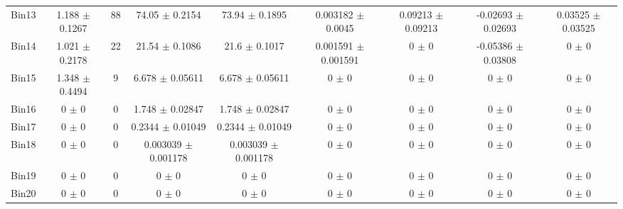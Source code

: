 \begin{tabular}{@{\extracolsep{4pt}}lcccccccc@{}}
     Bin13 & 1.188 $\pm$ 0.1267 & 88 & 74.05 $\pm$ 0.2154 & 73.94 $\pm$ 0.1895 & 0.003182 $\pm$ 0.0045 & 0.09213 $\pm$ 0.09213 & -0.02693 $\pm$ 0.02693 & 0.03525 $\pm$ 0.03525 \\ 
     Bin14 & 1.021 $\pm$ 0.2178 & 22 & 21.54 $\pm$ 0.1086 & 21.6 $\pm$ 0.1017 & 0.001591 $\pm$ 0.001591 & 0 $\pm$ 0 & -0.05386 $\pm$ 0.03808 & 0 $\pm$ 0 \\ 
     Bin15 & 1.348 $\pm$ 0.4494 & 9 & 6.678 $\pm$ 0.05611 & 6.678 $\pm$ 0.05611 & 0 $\pm$ 0 & 0 $\pm$ 0 & 0 $\pm$ 0 & 0 $\pm$ 0 \\ 
     Bin16 & 0 $\pm$ 0 & 0 & 1.748 $\pm$ 0.02847 & 1.748 $\pm$ 0.02847 & 0 $\pm$ 0 & 0 $\pm$ 0 & 0 $\pm$ 0 & 0 $\pm$ 0 \\ 
     Bin17 & 0 $\pm$ 0 & 0 & 0.2344 $\pm$ 0.01049 & 0.2344 $\pm$ 0.01049 & 0 $\pm$ 0 & 0 $\pm$ 0 & 0 $\pm$ 0 & 0 $\pm$ 0 \\ 
     Bin18 & 0 $\pm$ 0 & 0 & 0.003039 $\pm$ 0.001178 & 0.003039 $\pm$ 0.001178 & 0 $\pm$ 0 & 0 $\pm$ 0 & 0 $\pm$ 0 & 0 $\pm$ 0 \\ 
     Bin19 & 0 $\pm$ 0 & 0 & 0 $\pm$ 0 & 0 $\pm$ 0 & 0 $\pm$ 0 & 0 $\pm$ 0 & 0 $\pm$ 0 & 0 $\pm$ 0 \\ 
     Bin20 & 0 $\pm$ 0 & 0 & 0 $\pm$ 0 & 0 $\pm$ 0 & 0 $\pm$ 0 & 0 $\pm$ 0 & 0 $\pm$ 0 & 0 $\pm$ 0 \\ 
\hline\hline
  \end{tabular}
